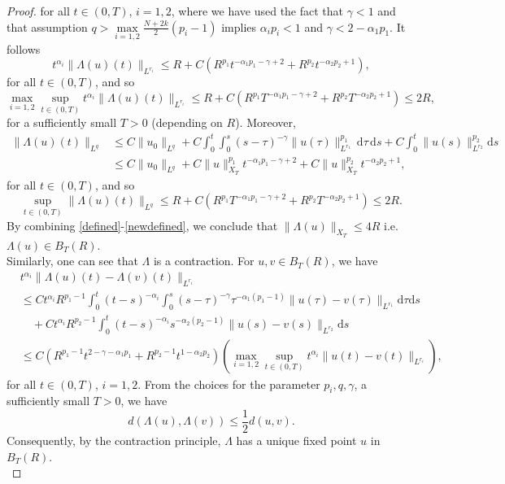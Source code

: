 \documentclass[a4,psfig,english,12pt,epsf,portrait]{article}
\numberwithin{equation}{section}
\begin{document}
\begin{proof}
	for all $t\in (0,T)$, $i=1,2$, where we have used the fact  that $\gamma<1$ and that assumption $q>\max\limits_{i=1,2}\frac{N+2k}{2}(p_i-1)$ implies $\alpha_i p_i<1$ and $\gamma < 2-\alpha_1 p_1$. It follows
	\begin{equation*}
		t^{\alpha_i} \|\Lambda(u)(t)\|_{L^{r_i}} \leq R + C\left( R^{p_1} t^{-\alpha_1 p_1-\gamma+2} +  R^{p_2} t^{-\alpha_2 p_2+1}  \right),
	\end{equation*}
	for all $t\in(0,T)$, and so 
	\begin{equation}\label{defined}
		\max_{i=1,2} \sup_{t \in (0,T)}t^{\alpha_i}\|\Lambda(u)(t)\|_{L^{r_i}} \leq R +C\left(  R^{p_1} T^{-\alpha_1 p_1-\gamma+2} +  R^{p_2} T^{-\alpha_2 p_2+1}  \right) \leq 2R, 
	\end{equation}
	for a sufficiently small $T>0$ (depending on $R$). Moreover, 
	\begin{align*}
		\|\Lambda(u)(t)\|_{L^{q}} & \leq  C\|u_0\|_{L^q} +C   \int_{0}^{t} \int_0^s (s-\tau)^{-\gamma} \|u(\tau)\|^{p_1}_{L^{r_1}} \, \mathrm{d}\tau \,\mathrm{d}s +C \int_{0}^{t}  \|u(s)\|^{p_2}_{L^{r_2}} \mathrm{d}s \\
		&\leq C\|u_0\|_{L^q}+ C \|u\|^{p_1}_{X_T}  t^{-\alpha_1 p_1-\gamma+2} + C \|u\|^{p_2}_{X_T}  t^{-\alpha_2 p_2+1} ,
	\end{align*}
	for all $t\in (0,T)$, and so 
	\begin{equation}\label{newdefined}
		\sup_{t \in (0,T)}\|\Lambda(u)(t)\|_{L^{q}} \leq R +C\left(  R^{p_1} T^{-\alpha_1 p_1-\gamma+2} +  R^{p_2} T^{-\alpha_2 p_2+1}  \right) \leq 2R.
	\end{equation}	
	By combining \eqref{defined}-\eqref{newdefined}, we conclude that $\|\Lambda(u)\|_{X_T}\leq 4 R$ i.e. $\Lambda(u) \in B_{T}(R)$.\\
	Similarly, one can see that $\Lambda$ is a contraction. For $u,v \in B_T(R)$, we have
	\begin{align*}
		&t^{\alpha_i}\|\Lambda(u)(t)-\Lambda(v)(t)\|_{L^{r_i}} \\
		& \leq  C t^{\alpha_i} R^{p_1-1} \int_{0}^{t} (t-s)^{-\alpha_i} \int_0^s (s-\tau)^{-\gamma} \tau^{-\alpha_1(p_1-1)} \|u(\tau)-v(\tau)\|_{L^{r_1}} \mathrm{d}\tau \mathrm{d}s \\
		& \quad+ C t^{\alpha_i} R^{p_2-1} \int_{0}^{t} (t-s)^{-\alpha_i}s^{-\alpha_2(p_2-1)} \|u(s)-v(s)\|_{L^{r_2}} \mathrm{d}s  \\
		&\leq  C \left( R^{p_1-1} t^{2-\gamma-\alpha_1p_1} + R^{p_2-1} t^{1-\alpha_2p_2} \right) \left(\max_{i=1,2} \sup_{t \in (0,T)}t^{\alpha_i} \|u(t) - v(t)\|_{L^{r_i}}\right) ,
	\end{align*}
	for all $t\in(0,T)$, $i=1,2$. From the choices for the parameter $p_i,q,\gamma$, a sufficiently small $T>0$, we have
	\begin{equation*}
		d(\Lambda(u),\Lambda(v)) \leq \frac{1}{2}d(u,v).
	\end{equation*}
	Consequently, by the contraction principle, $\Lambda$  has a unique fixed point $u$ in $B_T(R)$.\\
	

\end{proof}
\end{document}

